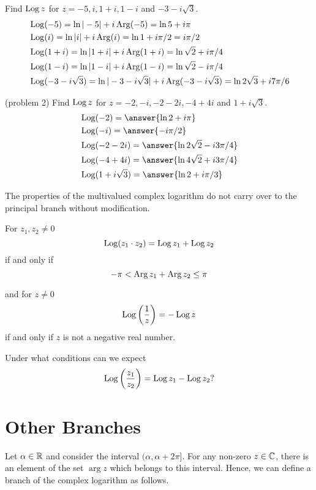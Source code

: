 \documentclass[handout]{ximera}
\begin{document}
\begin{example}[Example 2] 
Find $\operatorname{Log} z$ for $z = -5, i, 1+i, 1-i$ and $-3-i\sqrt 3$.\\
\begin{align*}
& \operatorname{Log}(-5) = \ln|-5|+ i \operatorname{Arg}(-5) = \ln 5 + i\pi\\
& \operatorname{Log}(i) = \ln|i|+ i \operatorname{Arg}(i) = \ln 1 + i\pi/2 = i\pi/2\\
& \operatorname{Log}(1+i) = \ln|1+i|+ i \operatorname{Arg}(1+i) = \ln \sqrt 2 + i\pi/4\\
& \operatorname{Log}(1-i) = \ln|1-i|+ i \operatorname{Arg}(1-i) = \ln \sqrt 2 - i\pi/4\\
& \operatorname{Log}(-3-i\sqrt 3) = \ln|-3-i\sqrt 3|+ i \operatorname{Arg}(-3-i\sqrt 3) = \ln 2\sqrt 3 + i7\pi/6
\end{align*}
\end{example}


\begin{problem}(problem 2) 
Find $\operatorname{Log} z$ for $z = -2, -i, -2-2i, -4+4i$ and $1+i\sqrt 3$.\\
\begin{align*}
& \Log(-2) = \answer{\ln 2 + i\pi }\\
& \Log(-i) = \answer{-i\pi/2}\\
& \Log(-2-2i) = \answer{\ln 2\sqrt 2 - i3\pi/4}\\
& \Log(-4+4i) = \answer{\ln 4\sqrt 2 +i3\pi/4}\\
& \Log(1+i\sqrt 3) = \answer{\ln 2+ i\pi/3}
\end{align*}
\end{problem}

The properties of the multivalued complex logarithm do not carry over to the principal branch without modification.
\begin{proposition}
For $z_1, z_2 \neq 0$
\[\operatorname{Log}(z_1\cdot z_2) = \operatorname{Log} z_1 + \operatorname{Log} z_2
\]
if and only if 
\[
-\pi < \operatorname{Arg} z_1 + \operatorname{Arg} z_2 \leq \pi\]

and for $z \neq 0$
\[
\operatorname{Log}\left(\frac{1}{z}\right) = - \operatorname{Log} z
\]
if and only if $z$ is not a negative real number.
\end{proposition}
\begin{question}Under what conditions can we expect
\[
\operatorname{Log}\left(\frac{z_1}{z_2}\right) = \operatorname{Log} z_1 - \operatorname{Log} z_2?
\]
\end{question}


\section{Other Branches}

Let $\alpha \in \mathbb R$ and consider the interval $(\alpha, \alpha + 2\pi]$. For any non-zero $z \in \mathbb C$, there is an element of the
set $\arg z$ which belongs to this interval. Hence, we can define a branch of the complex logarithm as follows.
\end{document}
